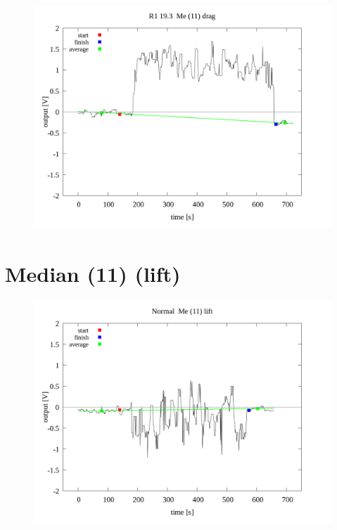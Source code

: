 \documentclass[a4paper]{jsarticle}
\begin{document}
\begin{figure}[htbp]
    \footnotesize
    \begin{center}
        \includegraphics[width=140mm]{../../../../33_result/210806/median/11/drag/03/R1_19.3_me(11)_drag_03.png}
    \end{center}
\end{figure}

\section{Median (11)  (lift)}

\begin{figure}[htbp]
    \footnotesize
    \begin{center}
        \includegraphics[width=140mm]{../../../../33_result/210806/median/11/lift/03/Normal_me(11)_lift_03.png}
    \end{center}
\end{figure}
\end{document}
